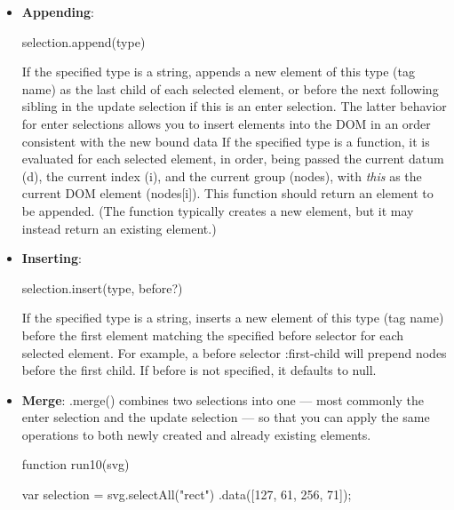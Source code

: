 \documentclass{report}
\begin{document}
\begin{itemize}
\begin{jscode}
{                selection.enter().append("rect")
                    .attr("x", 10) // let's just put it somewhere
                    .attr("y", 10)
                    .attr("width", 30)
                    .attr("height", 30)
                    .style("fill", "green")
            }
            \end{jscode}
        \item \textbf{Appending}: 
            \bigbreak \noindent 
            \begin{jscode}
            selection.append(type)
            \end{jscode}
            \bigbreak \noindent 
            If the specified type is a string, appends a new element of this type (tag name) as the last child of each selected element, or before the next following sibling in the update selection if this is an enter selection. The latter behavior for enter selections allows you to insert elements into the DOM in an order consistent with the new bound data
            \bigbreak \noindent 
            If the specified type is a function, it is evaluated for each selected element, in order, being passed the current datum (d), the current index (i), and the current group (nodes), with \textit{this} as the current DOM element (nodes[i]). This function should return an element to be appended. (The function typically creates a new element, but it may instead return an existing element.) 
        \item \textbf{Inserting}: 
            \bigbreak \noindent 
            \begin{jscode}
            selection.insert(type, before?)
            \end{jscode}
            \bigbreak \noindent 
            If the specified type is a string, inserts a new element of this type (tag name) before the first element matching the specified before selector for each selected element. For example, a before selector :first-child will prepend nodes before the first child. If before is not specified, it defaults to null.
        \item \textbf{Merge}: .merge() combines two selections into one — most commonly the enter selection and the update selection — so that you can apply the same operations to both newly created and already existing elements.
            \bigbreak \noindent 
            \begin{jscode}
                function run10(svg) {
                    var selection = svg.selectAll("rect")
                    .data([127, 61, 256, 71]);

}
\end{jscode}
\end{itemize}
\end{document}
